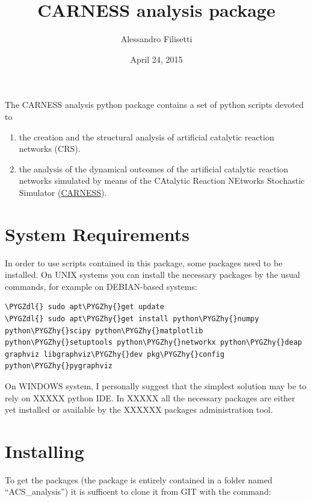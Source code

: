 \documentclass[letterpaper,10pt,english]{sphinxmanual}
\title{CARNESS analysis package}
\date{April 24, 2015}
\author{Alessandro Filisetti}
\def\PYGZdl{\char`\$}
\def\PYGZhy{\char`\-}
\begin{document}
\maketitle
\tableofcontents
{}\label{index::doc}


The CARNESS analysis python package contains a set of python scripts devoted to
\begin{enumerate}
\item {} 
the creation and the structural analysis of artificial catalytic reaction networks (CRS).

\item {} 
the analysis of the dynamical outcomes of the artificial catalytic reaction networks simulated by means of the CAtalytic Reaction NEtworks Stochastic Simulator (\href{http://github.org/paxelito}{CARNESS}).

\end{enumerate}


\chapter{System Requirements}
\label{index:carness-analysis-python-package-documentation}\label{index:system-requirements}
In order to use scripts contained in this package, some packages need to be installed.
On UNIX systems you can install the necessary packages by the usual commands, for example on DEBIAN-based systems:

\begin{Verbatim}[commandchars=\\\{\}]
\PYGZdl{} sudo apt\PYGZhy{}get update
\PYGZdl{} sudo apt\PYGZhy{}get install python\PYGZhy{}numpy python\PYGZhy{}scipy python\PYGZhy{}matplotlib python\PYGZhy{}setuptools python\PYGZhy{}networkx python\PYGZhy{}deap graphviz libgraphviz\PYGZhy{}dev pkg\PYGZhy{}config python\PYGZhy{}pygraphviz
\end{Verbatim}

On WINDOWS system, I personally suggest that the simplest solution may be to rely on XXXXX python IDE. In XXXXX all the necessary packages are either yet installed or available by the XXXXXX packages administration tool.


\chapter{Installing}
\label{index:installing}
To get the packages (the package is entirely contained in a folder named ``ACS\_analysis'') it is sufficent to clone it from GIT with the command:
\end{document}
